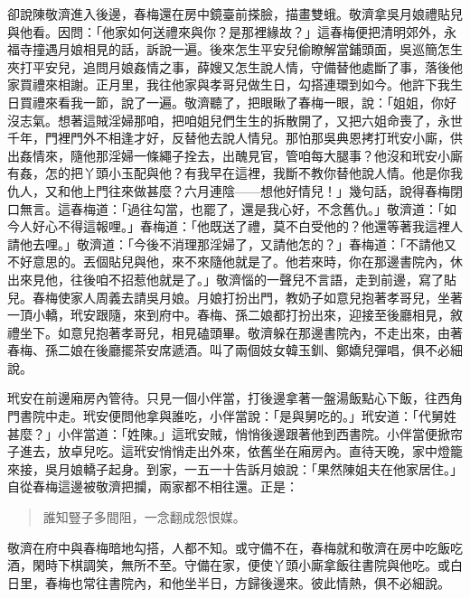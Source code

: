 卻說陳敬濟進入後邊，春梅還在房中鏡臺前搽臉，描畫雙蛾。敬濟拿吳月娘禮貼兒與他看。因問：「他家如何送禮來與你？是那裡緣故？」這春梅便把清明郊外，永福寺撞遇月娘相見的話，訴說一遍。後來怎生平安兒偷瞭解當鋪頭面，吳巡簡怎生夾打平安兒，追問月娘姦情之事，薛嫂又怎生說人情，守備替他處斷了事，落後他家買禮來相謝。正月里，我往他家與孝哥兒做生日，勾搭連環到如今。他許下我生日買禮來看我一節，說了一遍。敬濟聽了，把眼瞅了春梅一眼，說：「姐姐，你好沒志氣。想著這賊淫婦那咱，把咱姐兒們生生的拆散開了，又把六姐命喪了，永世千年，門裡門外不相逢才好，反替他去說人情兒。那怕那吳典恩拷打玳安小廝，供出姦情來，隨他那淫婦一條繩子拴去，出醜見官，管咱每大腿事？他沒和玳安小廝有姦，怎的把丫頭小玉配與他？有我早在這裡，我斷不教你替他說人情。他是你我仇人，又和他上門往來做甚麼？六月連陰——想他好情兒！」幾句話，說得春梅閉口無言。這春梅道：「過往勾當，也罷了，還是我心好，不念舊仇。」敬濟道：「如今人好心不得這報哩。」春梅道：「他既送了禮，莫不白受他的？他還等著我這裡人請他去哩。」敬濟道：「今後不消理那淫婦了，又請他怎的？」春梅道：「不請他又不好意思的。丟個貼兒與他，來不來隨他就是了。他若來時，你在那邊書院內，休出來見他，往後咱不招惹他就是了。」敬濟惱的一聲兒不言語，走到前邊，寫了貼兒。春梅使家人周義去請吳月娘。月娘打扮出門，教奶子如意兒抱著孝哥兒，坐著一頂小轎，玳安跟隨，來到府中。春梅、孫二娘都打扮出來，迎接至後廳相見，敘禮坐下。如意兒抱著孝哥兒，相見磕頭畢。敬濟躲在那邊書院內，不走出來，由著春梅、孫二娘在後廳擺茶安席遞酒。叫了兩個妓女韓玉釧、鄭嬌兒彈唱，俱不必細說。

玳安在前邊廂房內管待。只見一個小伴當，打後邊拿著一盤湯飯點心下飯，往西角門書院中走。玳安便問他拿與誰吃，小伴當說：「是與舅吃的。」玳安道：「代舅姓甚麼？」小伴當道：「姓陳。」這玳安賊，悄悄後邊跟著他到西書院。小伴當便掀帘子進去，放卓兒吃。這玳安悄悄走出外來，依舊坐在廂房內。直待天晚，家中燈籠來接，吳月娘轎子起身。到家，一五一十告訴月娘說：「果然陳姐夫在他家居住。」自從春梅這邊被敬濟把攔，兩家都不相往還。正是：
\begin{quote}
誰知豎子多間阻，一念翻成怨恨媒。
\end{quote}

敬濟在府中與春梅暗地勾搭，人都不知。或守備不在，春梅就和敬濟在房中吃飯吃酒，閑時下棋調笑，無所不至。守備在家，便使丫頭小廝拿飯往書院與他吃。或白日里，春梅也常往書院內，和他坐半日，方歸後邊來。彼此情熱，俱不必細說。

